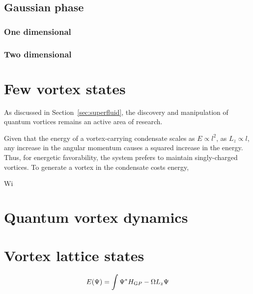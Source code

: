 \subsection{Gaussian phase}

\subsubsection{One dimensional}

\subsubsection{Two dimensional}



\section{Few vortex states}
As discussed in Section~\ref{sec:superfluid}, the discovery and manipulation of quantum vortices remains an active area of research.







Given that the energy of a vortex-carrying condensate scales as $E\propto l^2$, as $L_z \propto l$, any increase in the angular momentum causes a squared increase in the energy. Thus, for energetic favorability, the system prefers to maintain singly-charged vortices. To generate a vortex in the condensate costs energy,

Wi

\section{Quantum vortex dynamics}



\section{Vortex lattice states}
    \begin{equation}
        E(\Psi) = \int \Psi^{*} H_{\text GP} -\Omega L_z \Psi
    \end{equation}
